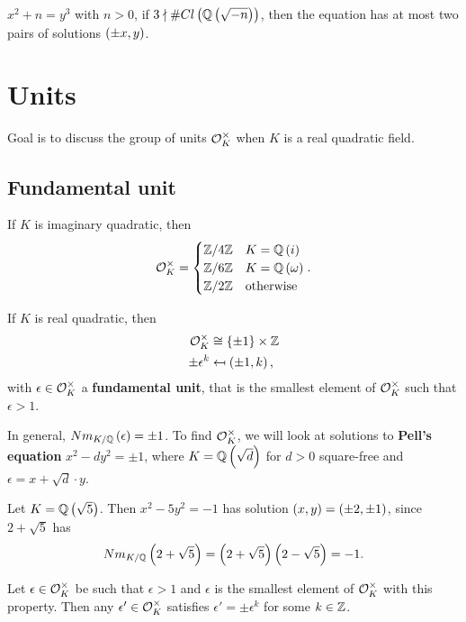 \begin{remark*}
$ x^2 + n = y^3 $ with $ n > 0 $, if $ 3 \nmid \#Cl\left( \mathbb{Q}\left( \sqrt{-n} \right) \right) $, then the equation has at most two pairs of solutions $ \left( \pm x, y \right) $.
\end{remark*}

\pagebreak

\section{Units}


Goal is to discuss the group of units $ \mathcal{O}_K^\times $ when $ K $ is a real quadratic field.

\subsection{Fundamental unit}

If $ K $ is imaginary quadratic, then
$$ \mathcal{O}_K^\times =
\begin{cases}
\mathbb{Z} / 4\mathbb{Z} & K = \mathbb{Q}\left( i \right) \\
\mathbb{Z} / 6\mathbb{Z} & K = \mathbb{Q}\left( \omega \right) \\
\mathbb{Z} / 2\mathbb{Z} & \text{otherwise}
\end{cases}.
$$

\begin{theorem}
If $ K $ is real quadratic, then
\begin{align*}
\mathcal{O}_K^\times & \cong \left\{ \pm 1 \right\} \times \mathbb{Z} \\
\pm\epsilon^k & \mapsfrom \left( \pm 1, k \right),
\end{align*}
with $ \epsilon \in \mathcal{O}_K^\times $ a \textbf{fundamental unit}, that is the smallest element of $ \mathcal{O}_K^\times $ such that $ \epsilon > 1 $.
\end{theorem}

In general, $ Nm_{K / \mathbb{Q}}\left( \epsilon \right) = \pm 1 $. To find $ \mathcal{O}_K^\times $, we will look at solutions to \textbf{Pell's equation} $ x^2 - dy^2 = \pm 1 $, where $ K = \mathbb{Q}\left( \sqrt{d} \right) $ for $ d > 0 $ square-free and $ \epsilon = x + \sqrt{d} \cdot y $.

\begin{example*}
Let $ K = \mathbb{Q}\left( \sqrt{5} \right) $. Then $ x^2 - 5y^2 = -1 $ has solution $ \left( x, y \right) = \left( \pm 2, \pm 1 \right) $, since $ 2 + \sqrt{5} $ has
$$ Nm_{K / \mathbb{Q}}\left( 2 + \sqrt{5} \right) = \left( 2 + \sqrt{5} \right)\left( 2 - \sqrt{5} \right) = -1. $$
\end{example*}

\begin{lemma}
Let $ \epsilon \in \mathcal{O}_K^\times $ be such that $ \epsilon > 1 $ and $ \epsilon $ is the smallest element of $ \mathcal{O}_K^\times $ with this property. Then any $ \epsilon' \in \mathcal{O}_K^\times $ satisfies $ \epsilon' = \pm\epsilon^k $ for some $ k \in \mathbb{Z} $.
\end{lemma}

